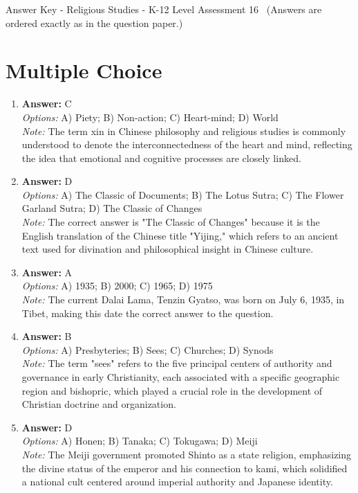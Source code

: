 \documentclass[12pt]{article}
\begin{document}
\begin{center}
Answer Key - Religious Studies - K-12 Level Assessment 16 \
\small (Answers are ordered exactly as in the question paper.)
\end{center}

\section*{Multiple Choice}
\begin{enumerate}[label=\arabic*.]
\item \textbf{Answer:} C
\\ \textit{Options:} A) Piety; B) Non-action; C) Heart-mind; D) World
\\ \textit{Note:} The term xin in Chinese philosophy and religious studies is commonly understood to denote the interconnectedness of the heart and mind, reflecting the idea that emotional and cognitive processes are closely linked.
\item \textbf{Answer:} D
\\ \textit{Options:} A) The Classic of Documents; B) The Lotus Sutra; C) The Flower Garland Sutra; D) The Classic of Changes
\\ \textit{Note:} The correct answer is "The Classic of Changes" because it is the English translation of the Chinese title "Yijing," which refers to an ancient text used for divination and philosophical insight in Chinese culture.
\item \textbf{Answer:} A
\\ \textit{Options:} A) 1935; B) 2000; C) 1965; D) 1975
\\ \textit{Note:} The current Dalai Lama, Tenzin Gyatso, was born on July 6, 1935, in Tibet, making this date the correct answer to the question.
\item \textbf{Answer:} B
\\ \textit{Options:} A) Presbyteries; B) Sees; C) Churches; D) Synods
\\ \textit{Note:} The term "sees" refers to the five principal centers of authority and governance in early Christianity, each associated with a specific geographic region and bishopric, which played a crucial role in the development of Christian doctrine and organization.
\item \textbf{Answer:} D
\\ \textit{Options:} A) Honen; B) Tanaka; C) Tokugawa; D) Meiji
\\ \textit{Note:} The Meiji government promoted Shinto as a state religion, emphasizing the divine status of the emperor and his connection to kami, which solidified a national cult centered around imperial authority and Japanese identity.
\end{enumerate}
\end{document}
